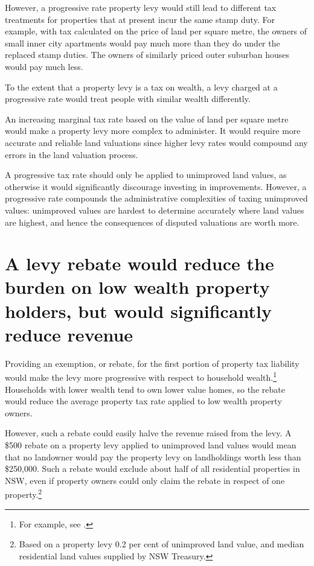However, a progressive rate property levy would still lead to different tax treatments for properties that at present incur the same stamp duty. For example, with tax calculated on the price of land per square metre, the owners of small inner city apartments would pay much more than they do under the replaced stamp duties. The owners of similarly priced outer suburban houses would pay much less. 

To the extent that a property levy is a tax on wealth, a levy charged at a progressive rate would treat people with similar wealth differently. 

An increasing marginal tax rate based on the value of land per square metre would make a property levy more complex to administer. It would require more accurate and reliable land valuations since higher levy rates would compound any errors in the land valuation process. 

A progressive tax rate should only be applied to unimproved land values, as otherwise it would significantly discourage investing in improvements. However, a progressive rate compounds the administrative complexities of taxing unimproved values: unimproved values are hardest to determine accurately where land values are highest, and hence the consequences of disputed valuations are worth more.

\section{\label{sec:PROP-6-2}A levy rebate would reduce the burden on low wealth property holders, but would significantly reduce revenue}
Providing an exemption, or rebate, for the first portion of property tax liability would make the levy more progressive with respect to household wealth.\footnote{For example, see \textcite[][8]{SlackBird2014}.}  Households with lower wealth tend to own lower value homes, so the rebate would reduce the average property tax rate applied to low wealth property owners.  

However, such a rebate could easily halve the revenue raised from the levy. A \$500 rebate on a property levy applied to unimproved land values would mean that no landowner would pay the property levy on landholdings worth less than \$250,000. Such a rebate would exclude about half of all residential properties in NSW, even if property owners could only claim the rebate in respect of one property.\footnote{Based on a property levy 0.2 per cent of unimproved land value, and median residential land values supplied by NSW Treasury.}

